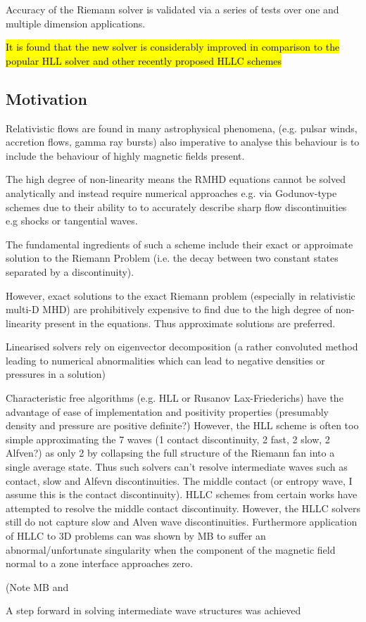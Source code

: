 \documentclass{article}
\begin{document}
Accuracy of the Riemann solver is validated via a series of tests over one and multiple dimension applications. 

\hl{It is found that the new solver is considerably improved in comparison to the popular HLL solver and other recently proposed HLLC schemes}

\subsection{Motivation}

Relativistic flows are found in many astrophysical phenomena, (e.g. pulsar winds, accretion flows, gamma ray bursts) also imperative to analyse this behaviour is to include the behaviour of highly magnetic fields present. 

The high degree of non-linearity means the RMHD equations cannot be solved analytically and instead require numerical approaches e.g. via Godunov-type schemes due to their ability to to accurately describe sharp flow discontinuities e.g shocks or tangential waves. 

The fundamental ingredients of such a scheme include their exact or approimate solution to the Riemann Problem (i.e. the decay between two constant states separated by a discontinuity).

However, exact solutions to the exact Riemann problem (especially in relativistic multi-D MHD) are prohibitively expensive to find due to the high degree of non-linearity present in the equations. Thus approximate solutions are preferred. 

Linearised solvers rely on eigenvector decomposition (a rather convoluted method leading to numerical abnormalities which can lead to negative densities or pressures in a solution)

Characteristic free algorithms (e.g. HLL or Rusanov Lax-Friederichs) have the advantage of ease of implementation and positivity properties (presumably density and pressure are positive definite?) However, the HLL scheme is often too simple approximating the 7 waves (1 contact discontinuity, 2 fast, 2 slow, 2 Alfven?) as only 2 by collapsing the full structure of the Riemann fan into a single average state. Thus such solvers can't resolve intermediate waves such as contact, slow and Alfevn discontinuities. The middle contact (or entropy wave, I assume this is the contact discontinuity). HLLC schemes from certain works have attempted to resolve the middle contact discontinuity. However, the HLLC solvers still do not capture slow and Alven wave discontinuities. Furthermore application of HLLC to 3D problems can was shown by MB to suffer an abnormal/unfortunate singularity when the component of the magnetic field normal to a zone interface approaches zero. 

(Note MB and 

A step forward in solving intermediate wave structures was achieved




\end{document}

